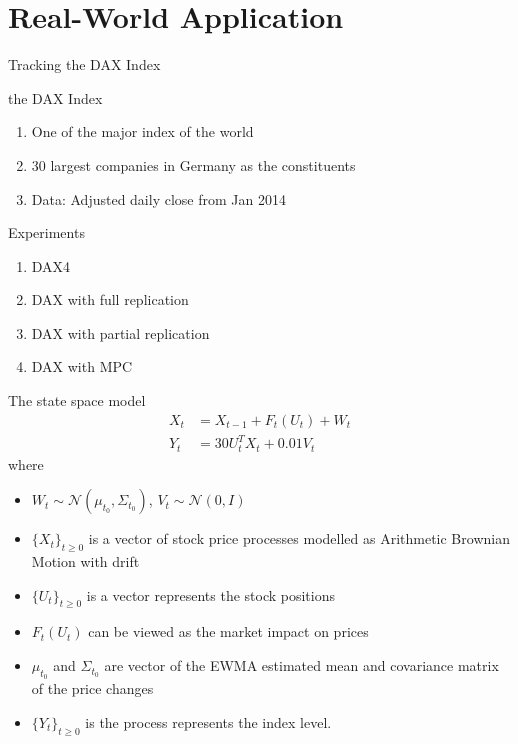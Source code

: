 \documentclass[handout]{beamer}
\begin{document}
\section{Real-World Application}
\begin{frame}{Tracking the DAX Index}
\begin{block}{the DAX Index}
\begin{enumerate}
\item One of the major index of the world
\item 30 largest companies in Germany as the constituents
\item Data: Adjusted daily close from Jan 2014
\end{enumerate}
\end{block}
\begin{block}{Experiments}
\begin{enumerate}
\item DAX4
\item DAX with full replication
\item DAX with partial replication
\item DAX with MPC
\end{enumerate}
\end{block}
\end{frame}

\begin{frame}{The state space model}
\begin{align*}
  X_t &= X_{t-1} + F_t(U_t) + W_t \\
  Y_t &= 30U^T_tX_t + 0.01V_t
\end{align*}
where
\begin{itemize}
\item $W_t \sim \mathcal{N}(\mu_{t_0}, \Sigma_{t_0})$, $V_t \sim \mathcal{N}(0, I)$
\item $\{X_t\}_{t \geq 0}$ is a vector of stock price processes modelled as Arithmetic Brownian Motion with drift
\item $\{U_t\}_{t \geq 0}$ is a vector represents the stock positions
\item $F_t(U_t)$ can be viewed as the market impact on prices
\item $\mu_{t_0}$ and $\Sigma_{t_0}$ are vector of the EWMA estimated mean and covariance matrix of the price changes
\item $\{Y_t\}_{t \geq 0}$ is the process represents the index level.
\end{itemize}
\end{frame}
\end{document}
